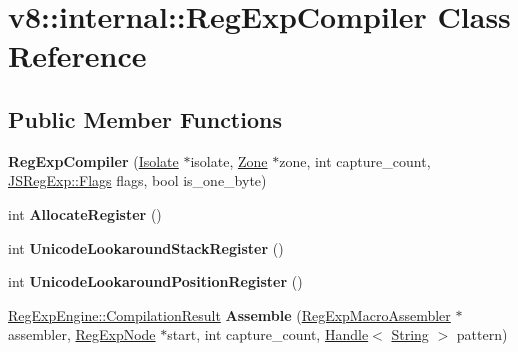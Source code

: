 \hypertarget{classv8_1_1internal_1_1_reg_exp_compiler}{}\section{v8\+:\+:internal\+:\+:Reg\+Exp\+Compiler Class Reference}
\label{classv8_1_1internal_1_1_reg_exp_compiler}
\subsection*{Public Member Functions}
\begin{DoxyCompactItemize}
\item 
{\bfseries Reg\+Exp\+Compiler} (\hyperlink{classv8_1_1internal_1_1_isolate}{Isolate} $\ast$isolate, \hyperlink{classv8_1_1internal_1_1_zone}{Zone} $\ast$zone, int capture\+\_\+count, \hyperlink{classv8_1_1base_1_1_flags}{J\+S\+Reg\+Exp\+::\+Flags} flags, bool is\+\_\+one\+\_\+byte)\hypertarget{classv8_1_1internal_1_1_reg_exp_compiler_a842b95cb77b9d54c764db7a4dd3e81ca}{}\label{classv8_1_1internal_1_1_reg_exp_compiler_a842b95cb77b9d54c764db7a4dd3e81ca}

\item 
int {\bfseries Allocate\+Register} ()\hypertarget{classv8_1_1internal_1_1_reg_exp_compiler_ab202d545cb1d4f3f57b85ecb74c9f0dc}{}\label{classv8_1_1internal_1_1_reg_exp_compiler_ab202d545cb1d4f3f57b85ecb74c9f0dc}

\item 
int {\bfseries Unicode\+Lookaround\+Stack\+Register} ()\hypertarget{classv8_1_1internal_1_1_reg_exp_compiler_a223a98e40c9dd7c49eb1c6458f849803}{}\label{classv8_1_1internal_1_1_reg_exp_compiler_a223a98e40c9dd7c49eb1c6458f849803}

\item 
int {\bfseries Unicode\+Lookaround\+Position\+Register} ()\hypertarget{classv8_1_1internal_1_1_reg_exp_compiler_aa1ad425dda7f02a1cf502d1e30114c5a}{}\label{classv8_1_1internal_1_1_reg_exp_compiler_aa1ad425dda7f02a1cf502d1e30114c5a}

\item 
\hyperlink{structv8_1_1internal_1_1_reg_exp_engine_1_1_compilation_result}{Reg\+Exp\+Engine\+::\+Compilation\+Result} {\bfseries Assemble} (\hyperlink{classv8_1_1internal_1_1_reg_exp_macro_assembler}{Reg\+Exp\+Macro\+Assembler} $\ast$assembler, \hyperlink{classv8_1_1internal_1_1_reg_exp_node}{Reg\+Exp\+Node} $\ast$start, int capture\+\_\+count, \hyperlink{classv8_1_1internal_1_1_handle}{Handle}$<$ \hyperlink{classv8_1_1internal_1_1_string}{String} $>$ pattern)\hypertarget{classv8_1_1internal_1_1_reg_exp_compiler_a83cacd8796d13f5de3ad21b58f25f9e6}{}\label{classv8_1_1internal_1_1_reg_exp_compiler_a83cacd8796d13f5de3ad21b58f25f9e6}


\end{DoxyCompactItemize}

